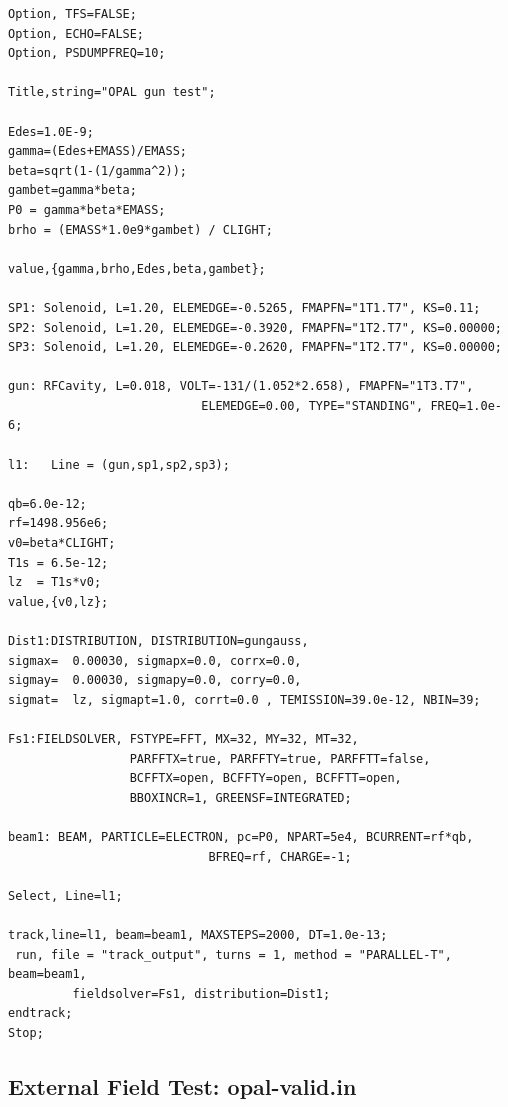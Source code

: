 \documentclass{psi-note}    %
\begin{document}
\begin{verbatim}
Option, TFS=FALSE;
Option, ECHO=FALSE;
Option, PSDUMPFREQ=10;

Title,string="OPAL gun test";

Edes=1.0E-9;
gamma=(Edes+EMASS)/EMASS;
beta=sqrt(1-(1/gamma^2));
gambet=gamma*beta;
P0 = gamma*beta*EMASS;
brho = (EMASS*1.0e9*gambet) / CLIGHT;

value,{gamma,brho,Edes,beta,gambet};

SP1: Solenoid, L=1.20, ELEMEDGE=-0.5265, FMAPFN="1T1.T7", KS=0.11;
SP2: Solenoid, L=1.20, ELEMEDGE=-0.3920, FMAPFN="1T2.T7", KS=0.00000;
SP3: Solenoid, L=1.20, ELEMEDGE=-0.2620, FMAPFN="1T2.T7", KS=0.00000;

gun: RFCavity, L=0.018, VOLT=-131/(1.052*2.658), FMAPFN="1T3.T7", 
                           ELEMEDGE=0.00, TYPE="STANDING", FREQ=1.0e-6;

l1:   Line = (gun,sp1,sp2,sp3); 

qb=6.0e-12;
rf=1498.956e6;
v0=beta*CLIGHT;
T1s = 6.5e-12;
lz  = T1s*v0;
value,{v0,lz};

Dist1:DISTRIBUTION, DISTRIBUTION=gungauss,
sigmax=  0.00030, sigmapx=0.0, corrx=0.0,
sigmay=  0.00030, sigmapy=0.0, corry=0.0,
sigmat=  lz, sigmapt=1.0, corrt=0.0 , TEMISSION=39.0e-12, NBIN=39;

Fs1:FIELDSOLVER, FSTYPE=FFT, MX=32, MY=32, MT=32, 
                 PARFFTX=true, PARFFTY=true, PARFFTT=false,
                 BCFFTX=open, BCFFTY=open, BCFFTT=open, 
                 BBOXINCR=1, GREENSF=INTEGRATED;

beam1: BEAM, PARTICLE=ELECTRON, pc=P0, NPART=5e4, BCURRENT=rf*qb, 
                            BFREQ=rf, CHARGE=-1;

Select, Line=l1;

track,line=l1, beam=beam1, MAXSTEPS=2000, DT=1.0e-13;
 run, file = "track_output", turns = 1, method = "PARALLEL-T", beam=beam1, 
         fieldsolver=Fs1, distribution=Dist1;
endtrack;
Stop;
\end{verbatim}

\subsection{External Field Test: opal-valid.in} \label{app:extftest}
\end{document}
